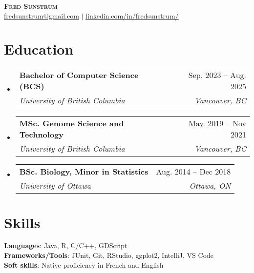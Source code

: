 \documentclass[letterpaper,11pt]{article}
\makeatletter
\newcommand{\resumeSubheading}[4]{
  \vspace{-2pt}\item
    \begin{tabular*}{0.97\textwidth}[t]{l@{\extracolsep{\fill}}r}
      \textbf{#1} & #2 \\
      \textit{\small#3} & \textit{\small #4} \\
    \end{tabular*}\vspace{-7pt}
}
\newcommand{\resumeSubHeadingListStart}{\begin{itemize}[leftmargin=0.15in, label={}]}
\newcommand{\resumeSubHeadingListEnd}{\end{itemize}}
\makeatother
\begin{document}

\begin{center}
    \textbf{\Huge \scshape Fred Sunstrum} \\ \vspace{1pt}\href{mailto:fr.sunstrum@gmail.com}{\underline{fredsunstrum@gmail.com}} $|$ 
    \href{https://linkedin.com/in/fredsunstrum/}{\underline{linkedin.com/in/fredsunstrum/}} %
\end{center}


\section{Education}
  \resumeSubHeadingListStart
    \resumeSubheading
      {Bachelor of Computer Science (BCS)}{Sep. 2023 -- Aug. 2025}
      {University of British Columbia}{Vancouver, BC}
    \resumeSubheading
      {MSc. Genome Science and Technology}{May. 2019 -- Nov 2021}          
      {University of British Columbia}{Vancouver, BC}
    \resumeSubheading
      {BSc. Biology, Minor in Statistics}{Aug. 2014 -- Dec 2018}
      {University of Ottawa}{Ottawa, ON}
      
  \resumeSubHeadingListEnd
%

\section{Skills}
 \begin{itemize}[leftmargin=0.15in, label={}]
    \small{\item{
     \textbf{Languages}{: Java, R, C/C++, GDScript} \\
     \textbf{Frameworks/Tools}{: JUnit, Git, RStudio, ggplot2, IntelliJ,  VS Code} \\
     \textbf{Soft skills}{: Native proficiency in French and English} \\
    }}
 \end{itemize}
\end{document}
